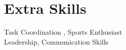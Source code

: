 \documentclass[]{deedy-resume-openfont}
\begin{document}
\begin{minipage}[t]{0.66\textwidth}
\section{Extra Skills}
\textbullet Task Coordination
, Sports Enthusiast\\
\textbullet Leadership, 
Communication Skills
 \\





\end{minipage} 
\end{document}
